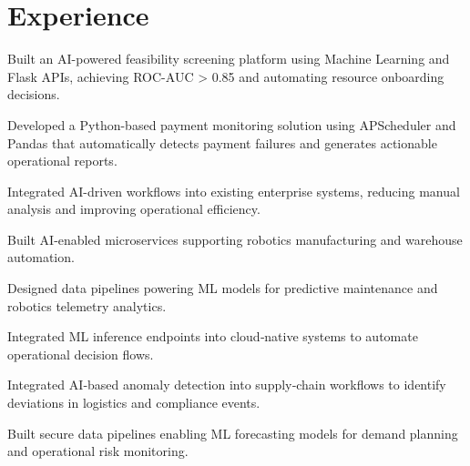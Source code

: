 \documentclass[letterpaper]{deedy-resume} %
\begin{document}
\hfill
%
%
\begin{minipage}[t]{0.66\textwidth} %

\section{Experience}

\begin{tightitemize}
\sectionspace
\item Built an AI-powered feasibility screening platform using Machine Learning and Flask APIs, achieving ROC-AUC > 0.85 and automating resource onboarding decisions.
\item Developed a Python-based payment monitoring solution using APScheduler and Pandas that automatically detects payment failures and generates actionable operational reports.
\item Integrated AI-driven workflows into existing enterprise systems, reducing manual analysis and improving operational efficiency.
\end{tightitemize}
\sectionspace

\begin{tightitemize}
\item Built AI-enabled microservices supporting robotics manufacturing and warehouse automation.
\item Designed data pipelines powering ML models for predictive maintenance and robotics telemetry analytics.
\item Integrated ML inference endpoints into cloud‑native systems to automate operational decision flows.

\end{tightitemize}

\sectionspace

\begin{tightitemize}
\item Integrated AI‑based anomaly detection into supply‑chain workflows to identify deviations in logistics and compliance events.
\item Built secure data pipelines enabling ML forecasting models for demand planning and operational risk monitoring.
\end{tightitemize}


\end{minipage}
\end{document}
